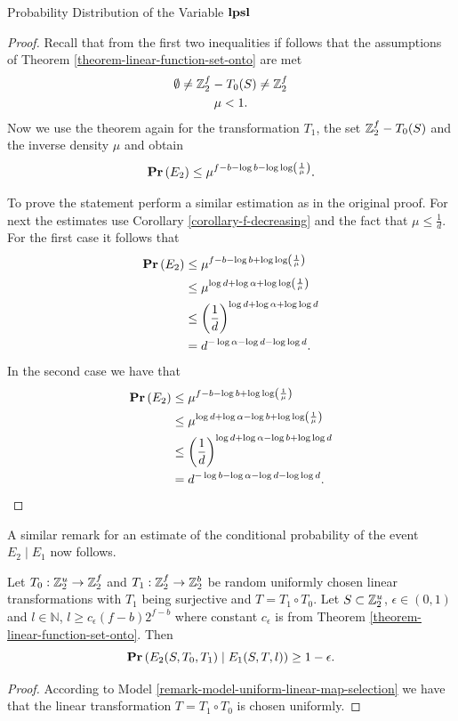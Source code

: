 \begin{section}{Probability Distribution of the Variable \texorpdfstring{$\mathbf{lpsl}$}{lpsl}}
\begin{proof}
Recall that from the first two inequalities if follows that the assumptions of Theorem \ref{theorem-linear-function-set-onto} are met
\begin{gather*}
\emptyset \neq \mathbb{Z}_{2}^{f} - T_0(S) \neq \mathbb{Z}_{2}^{f} \\
\mu < 1 \text{.}
\end{gather*}
Now we use the theorem again for the transformation $T_1$, the set $\mathbb{Z}_{2}^{f} - T_0(S)$ and the inverse density $\mu$ and obtain
\[
	\mathbf{Pr}\left(E_2\right) \leq \mu ^ {f - b - \log b - \log \log \left( \frac{1}{\mu} \right)} \text{.}
\]

To prove the statement perform a similar estimation as in the original proof. For next the estimates use Corollary \ref{corollary-f-decreasing} and the fact that $\mu \leq \frac{1}{d}$. For the first case it follows that
\[
\begin{split}
\mathbf{Pr}\left(E_2\right) 
	& \leq \mu ^ {f - b - \log b + \log \log \left( \frac{1}{\mu} \right)} \\
	& \leq \mu ^ {\log d + \log \alpha + \log \log \left( \frac{1}{\mu} \right)} \\
	& \leq \left(\frac{1}{d}\right) ^ {\log d + \log \alpha + \log \log d} \\
	& = d ^ {-\log \alpha - \log d - \log \log d} \text{.}
\end{split}
\]
In the second case we have that 
\[
\begin{split}
\mathbf{Pr}\left(E_2\right) 
	& \leq \mu ^ {f - b - \log b + \log \log \left( \frac{1}{\mu} \right)} \\
	& \leq \mu ^ {\log d + \log \alpha - \log b  + \log \log \left( \frac{1}{\mu} \right)} \\
	& \leq \left(\frac{1}{d}\right) ^ {\log d + \log \alpha - \log b + \log \log d} \\
	& = d ^ {- \log b -\log \alpha - \log d - \log \log d} \text{.}
\end{split}
\]
\end{proof}

A similar remark for an estimate of the conditional probability of the event $E_2 \mid E_1$ now follows.
\begin{remark}
\label{remark-prob-l-length-chain}
Let $T_0: \mathbb{Z}_{2}^{u} \rightarrow \mathbb{Z}_{2}^{f}$ and $T_1: \mathbb{Z}_{2}^{f} \rightarrow \mathbb{Z}_{2}^{b}$ be random uniformly chosen linear transformations with $T_1$ being surjective and $T = T_1 \circ T_0$. Let $S \subset \mathbb{Z}_{2}^{u}$, $\epsilon \in (0, 1)$ and $l \in \mathbb{N}$, $l \geq c_{\epsilon}(f - b)2 ^ {f - b}$ where constant $c_\epsilon$ is from Theorem \ref{theorem-linear-function-set-onto}. Then
\[
	\mathbf{Pr}\left(E_2(S, T_0, T_1) \mid E_1(S, T, l)\right) \geq 1 - \epsilon \text{.}
\]
\end{remark}
\begin{proof}
According to Model \ref{remark-model-uniform-linear-map-selection} we have that the linear transformation $T = T_1 \circ T_0$ is chosen uniformly.


\end{proof}
\end{section}
